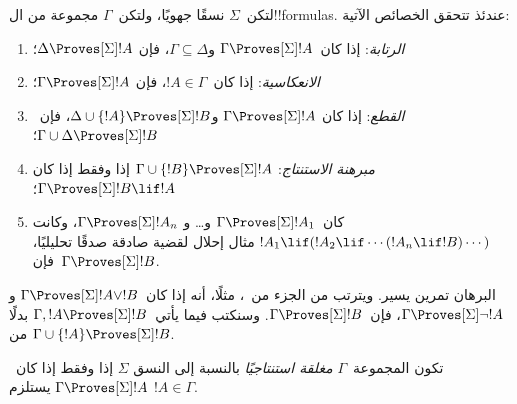 \documentclass[../../../include/open-logic-section]{subfiles}
\begin{document}


\begin{prop}
  لتكن~$\Sigma$ نسقًا جهويًا، ولتكن~$\Gamma$ مجموعة من ال!!{formula}s.
  عندئذ تتحقق الخصائص الآتية:
  \begin{enumerate}
  \item{} \emph{الرتابة}: إذا
    كان~$\Gamma \Proves[\Sigma] !A$ و$\Gamma \subseteq \Delta$، فإن
    $\Delta \Proves[\Sigma] !A$؛
  \item{}
    \emph{الانعكاسية}: إذا كان~$!A \in \Gamma$، فإن
    $\Gamma \Proves[\Sigma] !A$؛
  \item{} \emph{القطع}: إذا كان
    $\Gamma \Proves[\Sigma] !A$ و$\Delta \cup \{!A\}
    \Proves[\Sigma] !B$، فإن~$\Gamma \cup \Delta \Proves[\Sigma] !B$؛
  \item{} \emph{مبرهنة الاستنتاج}:
    $\Gamma \cup \{!B\} \Proves[\Sigma] !A$ إذا وفقط إذا كان
    $\Gamma \Proves[\Sigma] !B \lif !A$؛
  \item {}%
    كان~$\Gamma \Proves[\Sigma] !A_1$ و\dots{} و
    $\Gamma \Proves[\Sigma] !A_n$، وكانت
    $!A_1 \lif (!A_2 \lif \cdots (!A_n \lif !B)\cdots)$ مثال إحلال
    لقضية صادقة صدقًا تحليليًا، فإن~$\Gamma \Proves[\Sigma] !B$.
  \end{enumerate}
\end{prop}

البرهان تمرين يسير. ويترتب من الجزء
 من~،
مثلًا، أنه إذا كان~$\Gamma \Proves[\Sigma] !A \lor !B$ و
$\Gamma \Proves[\Sigma] \lnot !A$، فإن~$\Gamma \Proves[\Sigma] !B$.
وسنكتب فيما يأتي~$\Gamma, !A \Proves[\Sigma] !B$ بدلًا من
$\Gamma \cup \{!A\} \Proves[\Sigma] !B$.

\begin{defn}
  تكون المجموعة~$\Gamma$ \emph{مغلقة استنتاجيًا} بالنسبة إلى النسق
  $\Sigma$ إذا وفقط إذا كان~$\Gamma \Proves[\Sigma] !A$ يستلزم
  $!A \in \Gamma$.
\end{defn}
\end{document}
